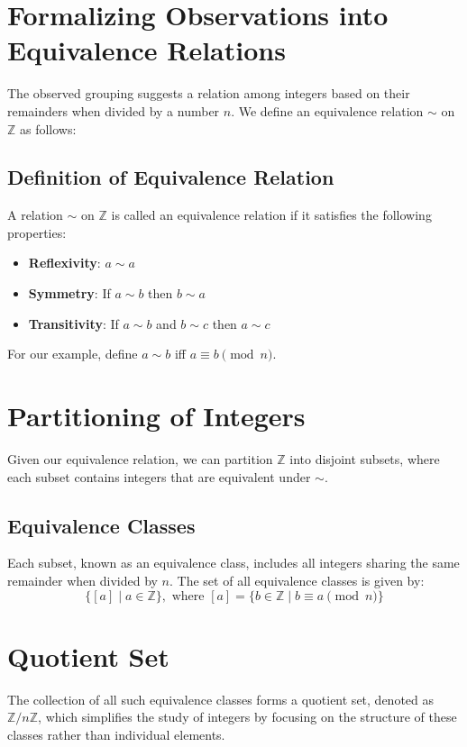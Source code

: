 \documentclass[11pt,openany]{article}
\begin{document}
\section{Formalizing Observations into Equivalence Relations}
The observed grouping suggests a relation among integers based on their remainders when divided by a number \( n \). We define an equivalence relation \( \sim \) on \( \mathbb{Z} \) as follows:

\subsection{Definition of Equivalence Relation}
A relation \( \sim \) on \( \mathbb{Z} \) is called an equivalence relation if it satisfies the following properties:
\begin{itemize}
	\item \textbf{Reflexivity}: \( a \sim a \)
	\item \textbf{Symmetry}: If \( a \sim b \) then \( b \sim a \)
	\item \textbf{Transitivity}: If \( a \sim b \) and \( b \sim c \) then \( a \sim c \)
\end{itemize}

For our example, define \( a \sim b \) iff \( a \equiv b \pmod{n} \).

\section{Partitioning of Integers}
Given our equivalence relation, we can partition \( \mathbb{Z} \) into disjoint subsets, where each subset contains integers that are equivalent under \( \sim \).

\subsection{Equivalence Classes}
Each subset, known as an equivalence class, includes all integers sharing the same remainder when divided by \( n \). The set of all equivalence classes is given by:
\[
\{[a] \mid a \in \mathbb{Z}\}, \text{ where } [a] = \{b \in \mathbb{Z} \mid b \equiv a \pmod{n}\}
\]

\section{Quotient Set}
The collection of all such equivalence classes forms a quotient set, denoted as \( \mathbb{Z}/n\mathbb{Z} \), which simplifies the study of integers by focusing on the structure of these classes rather than individual elements.
\end{document}
